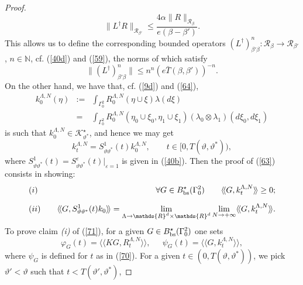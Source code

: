 \documentclass[reqno,11pt]{amsart}
\theoremstyle{definition}
\theoremstyle{remark}
\numberwithin{equation}{section}
\begin{document}
\begin{proof}
\begin{equation*}
\|L^\dagger R\|_{\mathcal{R}_{\beta'}} \leq \frac{4\alpha \|
R\|_{\mathcal{R}_{\beta}} }{e(\beta - \beta')}.
\end{equation*}
This allows us to define the corresponding bounded operators
$(L^\dagger)^n_{\beta'\beta} : \mathcal{R}_{\beta} \to
\mathcal{R}_{\beta'}$, $n\in \mathds{N}$, cf. (\ref{40d}) and
(\ref{59}), the norms of which satisfy
\begin{equation}
  \label{68b}
\|(L^\dagger)^n_{\beta'\beta} \| \leq n^n \left(
e\bar{T}(\beta,\beta')\right)^{-n}.
\end{equation}
On the other hand, we have that, cf. (\ref{9d}) and (\ref{64}),
\begin{eqnarray}
  \label{69}
k_0^{\Lambda,N} (\eta)& := & \int_{\Gamma_0^2} R^{\Lambda,N}_0
(\eta\cup\xi)\lambda(d\xi)\\[.2cm]&= & \int_{\Gamma_0^2} R^{\Lambda,N}_0
(\eta_0\cup\xi_0, \eta_1\cup\xi_1)(\lambda_0\otimes
\lambda_1)(d\xi_0, d \xi_1) \nonumber
\end{eqnarray}
is such that $k_0^{\Lambda,N}\in \mathcal{K}_{\vartheta^*}^\star$,
and hence we may get
\begin{equation}
  \label{70}
k_t^{\Lambda,N} = S^1_{\vartheta \vartheta^*}(t) k_0^{\Lambda,N},
\qquad t\in [0,T(\vartheta, \vartheta^*)),
\end{equation}
where $S^1_{\vartheta \vartheta^*}(t) = S^\varepsilon_{\vartheta
\vartheta^*}(t)|_{\varepsilon=1}$ is given in (\ref{40b}).
 Then the proof of (\ref{63}) consists in showing:
\begin{eqnarray}
  \label{71}
 &(i) & \quad \forall G\in B^\star_{\rm bs}(\Gamma^2_0) \qquad
 \langle \! \langle G, k^{\Lambda,N}_t \rangle \!\rangle \geq
 0;\\[.2cm]
 &(ii)& \quad  \langle \!\langle G, S^1_{\vartheta \vartheta^*} (t) k_0 \rangle \!\rangle =
 \lim_{\Lambda \to \mathds{R}^d \times \mathds{R}^d} \lim_{N\to +\infty} \langle \! \langle G, k^{\Lambda,N}_t \rangle \!\rangle .\nonumber
\end{eqnarray}
To prove claim {\it (i)} of (\ref{71}), for a given $G\in
B^\star_{\rm bs}(\Gamma^2_0)$ one sets
\begin{equation}
\label{72} \varphi_G (t) = \langle \! \langle KG , R^{\Lambda,N}_t
\rangle\!\rangle, \quad \ \  \psi_G (t) = \langle \! \langle G ,
k^{\Lambda,N}_t \rangle\!\rangle,
\end{equation}
where $\psi_G$ is defined for $t$ as in (\ref{70}). For a given
$t\in (0,T (\vartheta, \vartheta^*))$, we pick
$\vartheta'<\vartheta$ such that $t < T (\vartheta', \vartheta^*)$,

\end{proof}
\end{document}
